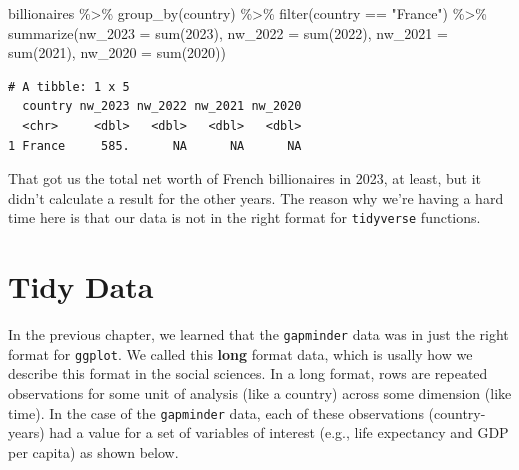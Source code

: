 \documentclass[
  letterpaper,
]{book}
\newenvironment{Shaded}{\begin{snugshade}}{\end{snugshade}}
\newcommand{\AttributeTok}[1]{\textcolor[rgb]{0.40,0.45,0.13}{#1}}
\newcommand{\FunctionTok}[1]{\textcolor[rgb]{0.28,0.35,0.67}{#1}}
\newcommand{\NormalTok}[1]{\textcolor[rgb]{0.00,0.23,0.31}{#1}}
\newcommand{\SpecialCharTok}[1]{\textcolor[rgb]{0.37,0.37,0.37}{#1}}
\newcommand{\StringTok}[1]{\textcolor[rgb]{0.13,0.47,0.30}{#1}}
\begin{document}
\begin{Shaded}
\begin{Highlighting}[]
\NormalTok{billionaires }\SpecialCharTok{\%\textgreater{}\%}
  \FunctionTok{group\_by}\NormalTok{(country) }\SpecialCharTok{\%\textgreater{}\%}
  \FunctionTok{filter}\NormalTok{(country }\SpecialCharTok{==} \StringTok{"France"}\NormalTok{) }\SpecialCharTok{\%\textgreater{}\%}
  \FunctionTok{summarize}\NormalTok{(}\AttributeTok{nw\_2023 =} \FunctionTok{sum}\NormalTok{(}\StringTok{\textasciigrave{}}\AttributeTok{2023}\StringTok{\textasciigrave{}}\NormalTok{),}
            \AttributeTok{nw\_2022 =} \FunctionTok{sum}\NormalTok{(}\StringTok{\textasciigrave{}}\AttributeTok{2022}\StringTok{\textasciigrave{}}\NormalTok{),}
            \AttributeTok{nw\_2021 =} \FunctionTok{sum}\NormalTok{(}\StringTok{\textasciigrave{}}\AttributeTok{2021}\StringTok{\textasciigrave{}}\NormalTok{),}
            \AttributeTok{nw\_2020 =} \FunctionTok{sum}\NormalTok{(}\StringTok{\textasciigrave{}}\AttributeTok{2020}\StringTok{\textasciigrave{}}\NormalTok{))}
\end{Highlighting}
\end{Shaded}

\begin{verbatim}
# A tibble: 1 x 5
  country nw_2023 nw_2022 nw_2021 nw_2020
  <chr>     <dbl>   <dbl>   <dbl>   <dbl>
1 France     585.      NA      NA      NA
\end{verbatim}

That got us the total net worth of French billionaires in 2023, at
least, but it didn't calculate a result for the other years. The reason
why we're having a hard time here is that our data is not in the right
format for \texttt{tidyverse} functions.

\hypertarget{tidy-data}{%
\section{Tidy Data}\label{tidy-data}}

In the previous chapter, we learned that the \texttt{gapminder} data was
in just the right format for \texttt{ggplot}. We called this
\textbf{long} format data, which is usally how we describe this format
in the social sciences. In a long format, rows are repeated observations
for some unit of analysis (like a country) across some dimension (like
time). In the case of the \texttt{gapminder} data, each of these
observations (country-years) had a value for a set of variables of
interest (e.g., life expectancy and GDP per capita) as shown below.
\end{document}
